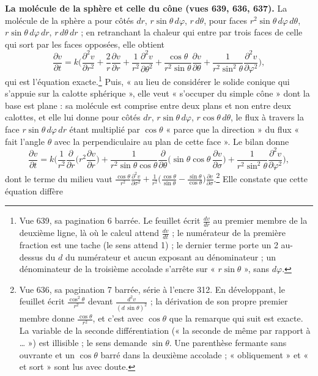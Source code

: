 \documentclass[11pt,a4paper]{article}
\begin{document}
\textbf{La molécule de la sphère et celle du cône (vues 639, 636, 637).} La
molécule de la sphère a pour côtés $dr$, $r\sin\theta\,d\varphi$, $r\,d\theta$,
pour faces $r^2\sin\theta\,d\varphi\,d\theta$, $r\sin\theta\,d\varphi\,dr$,
$r\,d\theta\,dr$ ; en retranchant la chaleur qui entre par trois faces de celle
qui sort par les faces opposées, elle obtient
\[
\frac{\partial v}{\partial t} = k\Big(\frac{\partial^2 v}{\partial r^2}
+ \frac2r\frac{\partial v}{\partial r} + \frac{1}{r^2}\frac{\partial^2
v}{\partial\theta^2} + \frac{\cos\theta}{r^2\sin\theta}\frac{\partial
v}{\partial\theta} + \frac{1}{r^2\sin^2\theta}\frac{\partial^2
v}{\partial\varphi^2}\Big),
\]
qui est l'équation exacte.\footnote{Vue 639, sa pagination 6 barrée. Le
feuillet écrit $\frac{dv}{dr}$ au premier membre de la deuxième ligne, là où le
calcul attend $\frac{dv}{dt}$ ; le numérateur de la première fraction est une
tache (le sens attend 1) ; le dernier terme porte un 2 au-dessus du $d$ du
numérateur et aucun exposant au dénominateur ; un dénominateur de la troisième
accolade s'arrête sur « $r\sin\theta$ », sans $d\varphi$.} Puis, « au lieu de
considérer le solide conique qui s'appuie sur la calotte sphérique », elle
veut « s'occuper du simple cône » dont la base est plane : sa molécule est
comprise entre deux plans et non entre deux calottes, et elle lui donne pour
côtés $dr$, $r\sin\theta\,d\varphi$, $r\cos\theta\,d\theta$, le flux à
travers la face $r\sin\theta\,d\varphi\,dr$ étant multiplié par $\cos\theta$
« parce que la direction » du flux « fait l'angle $\theta$ avec la
perpendiculaire au plan de cette face ». Le bilan donne
\[
\frac{\partial v}{\partial t} = k\Big(\frac{1}{r^2}\frac{\partial}{\partial
r}\Big(r^2\frac{\partial v}{\partial r}\Big) + \frac{1}{r^2\sin\theta\cos\theta}
\frac{\partial}{\partial\theta}\Big(\sin\theta\cos\theta\,\frac{\partial
v}{\partial\sigma}\Big) + \frac{1}{r^2\sin^2\theta}\frac{\partial^2
v}{\partial\varphi^2}\Big),
\]
dont le terme du milieu vaut $\frac{\cos\theta}{r^2}\frac{\partial^2
v}{\partial\sigma^2} + \frac{1}{r^2}\big(\frac{\cos\theta}{\sin\theta} -
\frac{\sin\theta}{\cos\theta}\big)\frac{\partial v}{\partial\sigma}$.\footnote{Vue
636, sa pagination 7 barrée, série à l'encre 312. En développant, le feuillet
écrit $\frac{\cos^2\theta}{r^2}$ devant $\frac{d^2v}{(d\,\sin\theta)^2}$ ; la
dérivation de son propre premier membre donne $\frac{\cos\theta}{r^2}$, et
c'est avec $\cos\theta$ que la remarque qui suit est exacte. La variable de la
seconde différentiation (« la seconde de même par rapport à … ») est
illisible ; le sens demande $\sin\theta$. Une parenthèse fermante sans
ouvrante et un $\cos\theta$ barré dans la deuxième accolade ; « obliquement »
et « et sort » sont lus avec doute.} Elle constate que cette équation diffère
\end{document}
